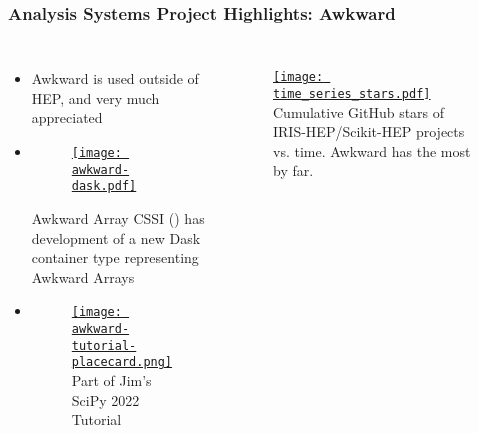 \begin{frame}
  \frametitle{Analysis Systems Project Highlights: Awkward}

  \begin{columns}
    \begin{itemize}\setlength{\itemsep}{0.1 cm}
      \item Awkward is used outside of HEP, and very much appreciated
      \item \begin{figure}
        \begin{center}
            \href{https://iris-hep.org/projects/awkward-dask.html}{\texttt{[image: awkward-dask.pdf]}}
        \end{center}
    \end{figure}
   Awkward Array CSSI () has development of a new Dask container type representing Awkward Arrays
      \item
      \begin{figure}
        \begin{center}
            \href{https://github.com/jpivarski-talks/2022-07-11-scipy-loopy-tutorial}{\texttt{[image: awkward-tutorial-placecard.png]}}
            Part of Jim's SciPy 2022 Tutorial
        \end{center}
      \end{figure}
    \end{itemize}
%
    \begin{figure}
        \begin{center}
            \href{https://iris-hep.org/analysis-community-summary/\#stars}{\texttt{[image: time\_series\_stars.pdf]}}
            Cumulative GitHub stars of IRIS-HEP/Scikit-HEP projects vs. time. Awkward has the most by far.
        \end{center}
    \end{figure}
  \end{columns}

\end{frame}

